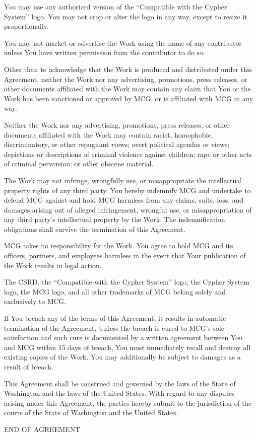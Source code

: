 You may use any authorized version of the “Compatible with the Cypher System” logo. You may not crop or alter the logo in any way, except to resize it proportionally.

You may not market or advertise the Work using the name of any contributor unless You have written permission from the contributor to do so.

Other than to acknowledge that the Work is produced and distributed under this Agreement, neither the Work nor any advertising, promotions, press releases, or other documents affiliated with the Work may contain any claim that You or the Work has been sanctioned or approved by MCG, or is affiliated with MCG in any way.

Neither the Work nor any advertising, promotions, press releases, or other documents affiliated with the Work may contain racist, homophobic, discriminatory, or other repugnant views; overt political agendas or views; depictions or descriptions of criminal violence against children; rape or other acts of criminal perversion; or other obscene material.

The Work may not infringe, wrongfully use, or misappropriate the intellectual property rights of any third party. You hereby indemnify MCG and undertake to defend MCG against and hold MCG harmless from any claims, suits, loss, and damages arising out of alleged infringement, wrongful use, or misappropriation of any third party’s intellectual property by the Work. The indemnification obligations shall survive the termination of this Agreement.

MCG takes no responsibility for the Work. You agree to hold MCG and its officers, partners, and employees harmless in the event that Your publication of the Work results in legal action.

The CSRD, the “Compatible with the Cypher System” logo, the Cypher System logo, the MCG logo, and all other trademarks of MCG belong solely and exclusively to MCG.

If You breach any of the terms of this Agreement, it results in automatic termination of the Agreement. Unless the breach is cured to MCG’s sole satisfaction and such cure is documented by a written agreement between You and MCG within 15 days of breach, You must immediately recall and destroy all existing copies of the Work. You may additionally be subject to damages as a result of breach.

This Agreement shall be construed and governed by the laws of the State of Washington and the laws of the United States. With regard to any disputes arising under this Agreement, the parties hereby submit to the jurisdiction of the courts of the State of Washington and the United States.

END OF AGREEMENT